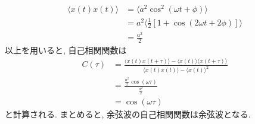 \begin{align}
    \langle x(t) x(t) \rangle
    &=
    \langle
        a^{2} \cos^{2} (\omega t + \phi)
    \rangle \\
    &=
    a^{2} \langle \frac{1}{2} [1 + \cos(2\omega t + 2\phi)] \rangle \\
    &=
    \frac{a^{2}}{2}
\end{align}
以上を用いると, 自己相関関数は
\begin{align}
    C(\tau)
    &=
    \frac{\langle x(t) x(t + \tau) \rangle - \langle x(t) \rangle \langle x(t + \tau) \rangle}{\langle x(t) x(t) \rangle - \langle x(t) \rangle^{2}} \\
    &=
    \frac{\frac{a^{2}}{2} \cos(\omega \tau)}{\frac{a^{2}}{2}} \\
    &=
    \cos(\omega \tau)
\end{align}
と計算される.
まとめると, 余弦波の自己相関関数は余弦波となる.

% 
% 

